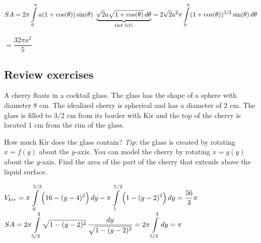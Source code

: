 \begin{Answer}
    \ifanalysis
    \Question $SA=2 \pi \ds \int \limits_{0}^{\pi} a(1+\cos(\theta))\sin(\theta) \ \underbrace{\sqrt{2}a\sqrt{1+\cos(\theta)} \, d\theta}_{\text{Oef 5(f)}} = 2\sqrt{2} a^2 \pi \ds \int \limits_{0}^{\pi} (1+\cos(\theta))^{3/2}\sin(\theta) \, d\theta$ \par
    \hspace{0.4cm} $ = \dfrac{32\pi a^2}{5}  $
    \fi

\end{Answer}

\subsection*{Review exercises}
\begin{Exercise}[difficulty = 3] A cherry floats in a cocktail glass. The glass has the shape of a sphere with diameter $8$ cm. The idealized cherry is spherical and has a diameter of $2$ cm. The glass is filled to $3/2$ cm from its border with Kir and the top of the cherry is located $1$ cm from the rim of the glass.

\Question How much Kir does the glass contain? \emph{Tip}: the glass is created by rotating $x=f(y)$ about the $y$-axis. You can model the cherry by rotating $x=g(y)$  about the $y$-axis.
\Question Find the area of the part of the cherry that extends above the liquid surface.

\end{Exercise}

\begin{Answer}
    
        \Question $V_{kir} = \pi \displaystyle \int \limits_0^{5/2} \left( 16-(y-4)^2 \right) dy - \pi \displaystyle \int \limits_1^{5/2} \left( 1-(y-2)^2 \right) dy = \dfrac{56}{3}\pi$
        \Question $SA = 2\pi \displaystyle \int \limits_{5/2}^3 \sqrt{1-(y-2)^2} \, \dfrac{dy}{\sqrt{1-(y-2)^2}} = 2\pi \displaystyle \int \limits_{5/2}^3 dy = \pi$

\end{Answer}
